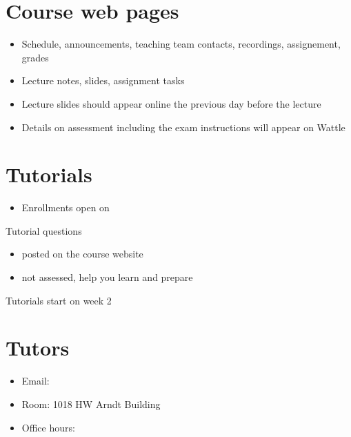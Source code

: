 \documentclass[letterpaper,10pt,english]{jupyterBook}
\begin{document}
\chapter{Course web pages}
\label{\detokenize{01.introduction:course-web-pages}}\begin{itemize}
\item {} 
\sphinxAtStartPar
{}
Schedule, announcements, teaching team contacts, recordings, assignement, grades

\item {} 
\sphinxAtStartPar
{}
Lecture notes, slides, assignment tasks

\item {} 
\sphinxAtStartPar
Lecture slides should appear online the previous day before the lecture

\item {} 
\sphinxAtStartPar
Details on assessment including the exam instructions will appear on Wattle

\end{itemize}


\chapter{Tutorials}
\label{\detokenize{01.introduction:tutorials}}\begin{itemize}
\item {} 
\sphinxAtStartPar
Enrollments open on 

\end{itemize}

\sphinxAtStartPar
Tutorial questions
\begin{itemize}
\item {} 
\sphinxAtStartPar
posted on the course website

\item {} 
\sphinxAtStartPar
not assessed, help you learn and prepare

\end{itemize}

\sphinxAtStartPar
Tutorials start on week 2


\chapter{Tutors}
\label{\detokenize{01.introduction:tutors}}
\sphinxAtStartPar
{}
\begin{itemize}
\item {} 
\sphinxAtStartPar
Email: 

\item {} 
\sphinxAtStartPar
Room: 1018 HW Arndt Building

\item {} 
\sphinxAtStartPar
Office hours: 

\end{itemize}
\end{document}
